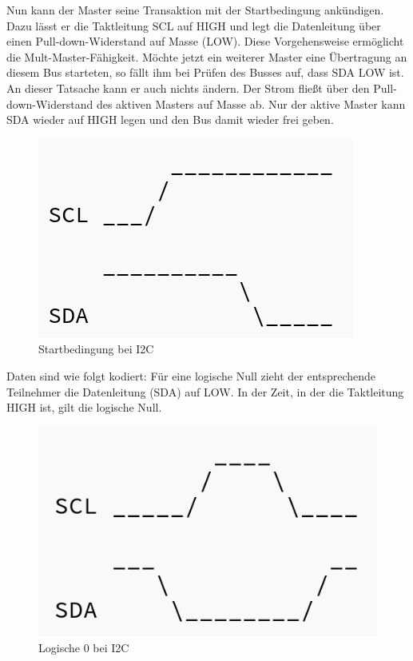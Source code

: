 Nun kann der Master seine Transaktion mit der Startbedingung ankündigen. Dazu lässt er die Taktleitung SCL auf HIGH und legt die Datenleitung über einen Pull-down-Widerstand auf Masse (LOW). Diese Vorgehensweise ermöglicht die Mult-Master-Fähigkeit. Möchte jetzt ein weiterer Master eine Übertragung an diesem Bus starteten, so fällt ihm bei Prüfen des Busses auf, dass SDA LOW ist. An dieser Tatsache kann er auch nichts ändern. Der Strom fließt über den Pull-down-Widerstand des aktiven Masters auf Masse ab. Nur der aktive Master kann SDA wieder auf HIGH legen und den Bus damit wieder frei geben.  

\begin{figure}[h!] 
\includegraphics[scale=0.3]{bilder/i2c_start}
\caption{Startbedingung bei \ac{I2C}}
\label{i2c_start}
\end{figure}

Daten sind wie folgt kodiert: Für eine logische Null zieht der entsprechende Teilnehmer die Datenleitung (SDA) auf LOW. In der Zeit, in der die Taktleitung HIGH ist, gilt die logische Null. 

\begin{figure}[h!] 
\includegraphics[scale=0.3]{bilder/i2c_0}
\caption{Logische 0 bei \ac{I2C}}
\label{i2c_0}
\end{figure}


